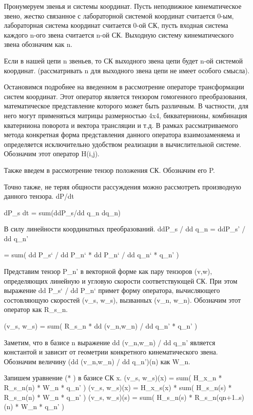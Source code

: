 \documentclass{article}
\begin{document}
Пронумеруем звенья и системы координат. Пусть неподвижное кинематическое звено, жестко связанное с лабораторной системой координат считается 0-ым, лабораторная система координат считается 0-ой СК, пусть входная система каждого n-ого звена считается n-ой СК. Выходную систему кинематического звена обозначим как n\*. 

Если в нашей цепи n звеньев, то СК выходного звена цепи будет n-ой системой координат. (рассматривать n\* для выходного звена цепи не имеет особого смысла).


Остановимся подробнее на введенном в рассмотрение операторе трансформации систем координат. Этот оператор является тензором гомогенного преобразования, математическое представление которого может быть различным. В частности, для него могут применяться матрицы размерностью 4x4, бикватернионы, комбинация кватерниона поворота и вектора трансляции и т.д. В рамках рассматриваемого метода конкретная форма представления данного оператора взаимозаменяема и определяется исключительно удобством реализации в вычислительной системе. Обозначим этот оператор H(i,j).

Также введем в рассмотрение тензор положения СК. Обозначим его P.

Точно также, не теряя общности рассуждения можно рассмотреть производную данного тензора. dP/dt

dP\_s
dt   = sum(ddP\_s/dd q\_n dq\_n) 

В силу линейности координатных преобразований. 
ddP\_s / dd q\_n = ddP\_s' / dd q\_n'

 = sum( dd P\_s` / dd P\_n` * dd P\_n` / dd q\_n` * q\_n' )

 Представим тензор P\_n' в векторной форме как пару тензоров (v,w), определяющих линейную и угловую скорости соответствующей СК. При этом выражение 
 dd P\_s` / dd P\_n` примет форму оператора, вычисляющего состовляющую скоростей (v\_s, w\_s), вызванных (v\_n, w\_n). Обозначим этот оператор как R\_s\_n.

(v\_s, w\_s) = sum(  R\_s\_n * dd (v\_n,w\_n) / dd q\_n' * q\_n' )

Заметим, что в базисе n выражение dd (v\_n,w\_n) / dd q\_n' является константой и зависит от геометрии конкретного кинематического звена. Обозначим величину (dd (v\_n,w\_n) / dd q\_n')(n) как W\_n.

Запишем уравнение (* ) в базисе СК x.
(v\_s, w\_s)(x) = sum( H\_x\_n * R\_s\_n(n) * W\_n * q\_n' )
(v\_s, w\_s)(x) = H\_x\_s(x) * sum( H\_s\_n(s) * R\_s\_n(n) * W\_n * q\_n' )
(v\_s, w\_s)(s) = sum( H\_s\_n(s) * R\_s\_n(qn+1..s)(n) * W\_n * q\_n' )
\end{document}
